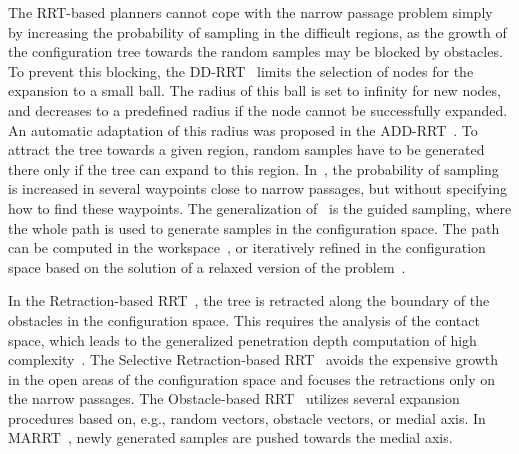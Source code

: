 \documentclass[usletter, 10pt, conference]{ieeeconf} %
\def\qrand{q_{rand}}
\def\qnear{q_{near}}
\begin{document}
The RRT-based planners cannot cope with the narrow passage problem simply by increasing the probability of sampling in the difficult regions, as the growth of the configuration tree towards the random samples may be blocked by obstacles. %
To prevent this blocking, the DD-RRT~\cite{yershovaDDRRT} limits the selection of nodes for the expansion to a small ball. 
The radius of this ball is set to infinity for new nodes, and decreases to a predefined radius if the node cannot be successfully expanded.
An automatic adaptation of this radius was proposed in the ADD-RRT~\cite{jailletADRRT}.
To attract the tree towards a given region, random samples have to be generated there only if the tree can expand to this region.
In~\cite{kardossRRTKK}, the probability of sampling is increased in several waypoints close to narrow passages, but without specifying how to find these waypoints.
The generalization of~\cite{kardossRRTKK} is the guided sampling, where the whole path is used to generate samples in the configuration space.
The path can be computed in the workspace~\cite{vonasek2009rrt}, or iteratively refined in the configuration space based on the solution of a relaxed version of the problem~\cite{bayazitIRC}.


In the Retraction-based RRT~\cite{zhangRetraction}, the tree is retracted along the boundary of the obstacles in the configuration space.
This requires the analysis of the contact space, which leads to the generalized penetration depth computation of high complexity~\cite{he2016efficient}. %
The Selective Retraction-based RRT~\cite{lee2012srrrt} avoids the expensive growth in the open areas of the configuration space and focuses the retractions only on the narrow passages.
The Obstacle-based RRT~\cite{amatoOBRRT} utilizes several expansion procedures based on, e.g., random vectors, obstacle vectors, or medial axis.
In MARRT~\cite{denny2014marrt}, newly generated samples are pushed towards the medial axis.
\end{document}

